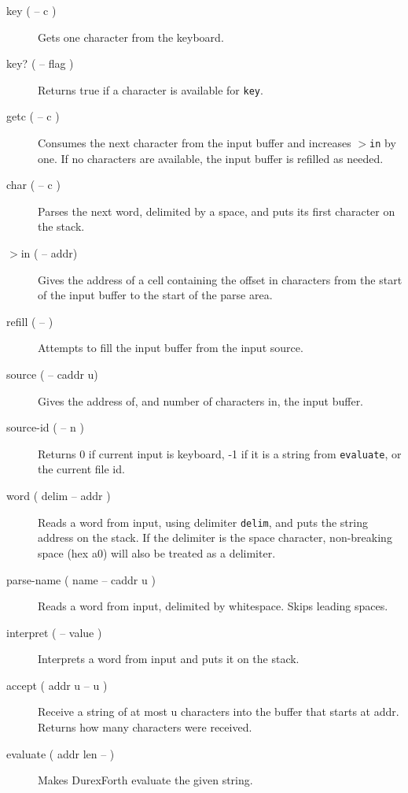 \begin{description}

\item[key ( -- c )] Gets one character from the keyboard.
\item[key? ( -- flag )] Returns true if a character is available for \texttt{key}.
\item[getc ( -- c )] Consumes the next character from the input buffer and increases \texttt{$>$in} by one. If no characters are available, the input buffer is refilled as needed.

\item[char ( -- c )] Parses the next word, delimited by a space, and puts its first character on the stack.

\item[$>$in ( -- addr)] Gives the address of a cell containing the offset in characters from the start of the input buffer to the start of the parse area.

\item[refill ( -- )] Attempts to fill the input buffer from the input source.

\item[source ( -- caddr u)] Gives the address of, and number of characters in, the input buffer.
\item[source-id ( -- n )] Returns 0 if current input is keyboard, -1 if it is a string from \texttt{evaluate}, or the current file id.

\item[word ( delim -- addr )] Reads a word from input, using delimiter \texttt{delim}, and puts the string address on the stack. If the delimiter is the space character, non-breaking space (hex a0) will also be treated as a delimiter.

\item[parse-name ( name -- caddr u )] Reads a word from input, delimited by whitespace. Skips leading spaces.

\item[interpret ( -- value )] Interprets a word from input and puts it on the stack.

\item[accept ( addr u -- u )] Receive a string of at most u characters into the buffer that starts at addr. Returns how many characters were received.

\item[evaluate ( addr len -- )] Makes DurexForth evaluate the given string.


\end{description}
